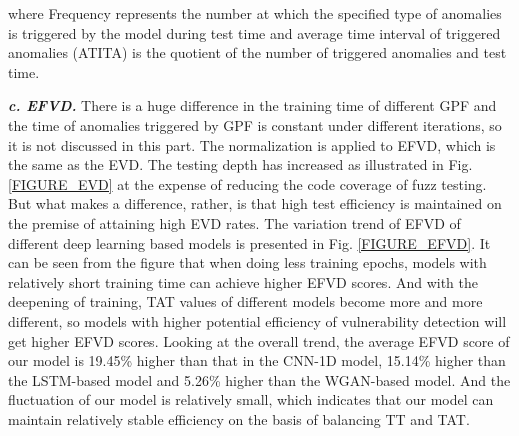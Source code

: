 where Frequency represents the number at which the specified type of anomalies is triggered by the model during test time and average time interval of triggered anomalies (ATITA) is the quotient of the number of triggered anomalies and test time.

\quad \textit{\textbf{c. EFVD.}}
There is a huge difference in the training time of different GPF and the time of anomalies triggered by GPF is constant under different iterations, so it is not discussed in this part. The normalization is applied to EFVD, which is the same as the EVD. The testing depth has increased as illustrated in Fig. \ref{FIGURE_EVD} at the expense of reducing the code coverage of fuzz testing. But what makes a difference, rather, is that high test efficiency is maintained on the premise of attaining high EVD rates. The variation trend of EFVD of different deep learning based models is presented in Fig. \ref{FIGURE_EFVD}. It can be seen from the figure that when doing less training epochs, models with relatively short training time can achieve higher EFVD scores. And with the deepening of training, TAT values of different models become more and more different, so models with higher potential efficiency of vulnerability detection will get higher EFVD scores. Looking at the overall trend, the average EFVD score of our model is 19.45\% higher than that in the CNN-1D model, 15.14\% higher than the LSTM-based model and 5.26\% higher than the WGAN-based model. And the fluctuation of our model is relatively small, which indicates that our model can maintain relatively stable efficiency on the basis of balancing TT and TAT.






